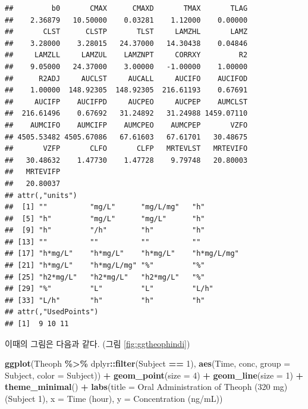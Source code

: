 \documentclass[
  11pt,
  krantz2, a4paper, twoside]{krantz}
\newenvironment{Shaded}{\begin{snugshade}}{\end{snugshade}}
\newcommand{\AttributeTok}[1]{\textcolor[rgb]{0.13,0.29,0.53}{#1}}
\newcommand{\DecValTok}[1]{\textcolor[rgb]{0.00,0.00,0.81}{#1}}
\newcommand{\FunctionTok}[1]{\textcolor[rgb]{0.13,0.29,0.53}{\textbf{#1}}}
\newcommand{\NormalTok}[1]{#1}
\newcommand{\SpecialCharTok}[1]{\textcolor[rgb]{0.81,0.36,0.00}{\textbf{#1}}}
\newcommand{\StringTok}[1]{\textcolor[rgb]{0.31,0.60,0.02}{#1}}
\theoremstyle{definition}
\theoremstyle{definition}
\theoremstyle{definition}
\theoremstyle{definition}
\theoremstyle{remark}
\begin{document}
\begin{verbatim}
##         b0       CMAX      CMAXD       TMAX       TLAG 
##    2.36879   10.50000    0.03281    1.12000    0.00000 
##       CLST      CLSTP       TLST     LAMZHL       LAMZ 
##    3.28000    3.28015   24.37000   14.30438    0.04846 
##     LAMZLL     LAMZUL    LAMZNPT     CORRXY         R2 
##    9.05000   24.37000    3.00000   -1.00000    1.00000 
##      R2ADJ     AUCLST     AUCALL     AUCIFO    AUCIFOD 
##    1.00000  148.92305  148.92305  216.61193    0.67691 
##     AUCIFP    AUCIFPD     AUCPEO     AUCPEP    AUMCLST 
##  216.61496    0.67692   31.24892   31.24988 1459.07110 
##    AUMCIFO    AUMCIFP    AUMCPEO    AUMCPEP       VZFO 
## 4505.53482 4505.67086   67.61603   67.61701   30.48675 
##       VZFP       CLFO       CLFP   MRTEVLST   MRTEVIFO 
##   30.48632    1.47730    1.47728    9.79748   20.80003 
##   MRTEVIFP 
##   20.80037 
## attr(,"units")
##  [1] ""          "mg/L"      "mg/L/mg"   "h"        
##  [5] "h"         "mg/L"      "mg/L"      "h"        
##  [9] "h"         "/h"        "h"         "h"        
## [13] ""          ""          ""          ""         
## [17] "h*mg/L"    "h*mg/L"    "h*mg/L"    "h*mg/L/mg"
## [21] "h*mg/L"    "h*mg/L/mg" "%"         "%"        
## [25] "h2*mg/L"   "h2*mg/L"   "h2*mg/L"   "%"        
## [29] "%"         "L"         "L"         "L/h"      
## [33] "L/h"       "h"         "h"         "h"        
## attr(,"UsedPoints")
## [1]  9 10 11
\end{verbatim}

이때의 그림은 다음과 같다. (그림 \ref{fig:ggtheophindi})

\begin{Shaded}
\begin{Highlighting}[]
\FunctionTok{ggplot}\NormalTok{(Theoph }\SpecialCharTok{\%\textgreater{}\%}\NormalTok{ dplyr}\SpecialCharTok{::}\FunctionTok{filter}\NormalTok{(Subject }\SpecialCharTok{==} \DecValTok{1}\NormalTok{), }
       \FunctionTok{aes}\NormalTok{(Time, conc, }\AttributeTok{group =}\NormalTok{ Subject, }\AttributeTok{color =}\NormalTok{ Subject)) }\SpecialCharTok{+}
  \FunctionTok{geom\_point}\NormalTok{(}\AttributeTok{size =} \DecValTok{4}\NormalTok{) }\SpecialCharTok{+} \FunctionTok{geom\_line}\NormalTok{(}\AttributeTok{size =} \DecValTok{1}\NormalTok{) }\SpecialCharTok{+}
  \FunctionTok{theme\_minimal}\NormalTok{() }\SpecialCharTok{+}
  \FunctionTok{labs}\NormalTok{(}\AttributeTok{title =} \StringTok{\textquotesingle{}Oral Administration of Theoph (320 mg) (Subject 1)\textquotesingle{}}\NormalTok{,}
       \AttributeTok{x =} \StringTok{\textquotesingle{}Time (hour)\textquotesingle{}}\NormalTok{, }\AttributeTok{y =} \StringTok{\textquotesingle{}Concentration (ng/mL)\textquotesingle{}}\NormalTok{)}
\end{Highlighting}
\end{Shaded}
\end{document}
